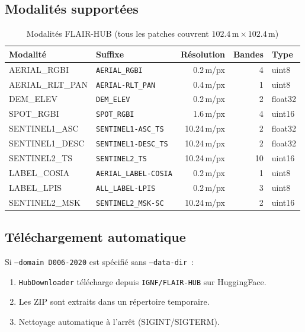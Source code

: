 \documentclass[a4paper, 11pt, french]{article}
\newcommand{\code}[1]{\texttt{#1}}
\begin{document}
\subsection{Modalités supportées}

\begin{table}[H]
\centering\small
\begin{tabular}{llrrl}
\toprule
\textbf{Modalité} & \textbf{Suffixe} & \textbf{Résolution} & \textbf{Bandes}
  & \textbf{Type} \\
\midrule
AERIAL\_RGBI      & \code{AERIAL\_RGBI}      & 0.2\,m/px  & 4 & uint8 \\
AERIAL\_RLT\_PAN  & \code{AERIAL-RLT\_PAN}   & 0.4\,m/px  & 1 & uint8 \\
DEM\_ELEV         & \code{DEM\_ELEV}         & 0.2\,m/px  & 2 & float32 \\
SPOT\_RGBI        & \code{SPOT\_RGBI}        & 1.6\,m/px  & 4 & uint16 \\
SENTINEL1\_ASC    & \code{SENTINEL1-ASC\_TS} & 10.24\,m/px & 2 & float32 \\
SENTINEL1\_DESC   & \code{SENTINEL1-DESC\_TS}& 10.24\,m/px & 2 & float32 \\
SENTINEL2\_TS     & \code{SENTINEL2\_TS}     & 10.24\,m/px & 10 & uint16 \\
LABEL\_COSIA      & \code{AERIAL\_LABEL-COSIA} & 0.2\,m/px & 1 & uint8 \\
LABEL\_LPIS       & \code{ALL\_LABEL-LPIS}   & 0.2\,m/px  & 3 & uint8 \\
SENTINEL2\_MSK    & \code{SENTINEL2\_MSK-SC} & 10.24\,m/px & 2 & uint16 \\
\bottomrule
\end{tabular}
\caption{Modalités FLAIR-HUB (tous les patches couvrent
         $102.4\,\text{m} \times 102.4\,\text{m}$)}
\end{table}

\subsection{Téléchargement automatique}

Si \code{--domain D006-2020} est spécifié sans \code{--data-dir}~:
\begin{enumerate}
  \item \code{HubDownloader} télécharge depuis \code{IGNF/FLAIR-HUB}
        sur HuggingFace.
  \item Les ZIP sont extraits dans un répertoire temporaire.
  \item Nettoyage automatique à l'arrêt (SIGINT/SIGTERM).
\end{enumerate}
\end{document}
